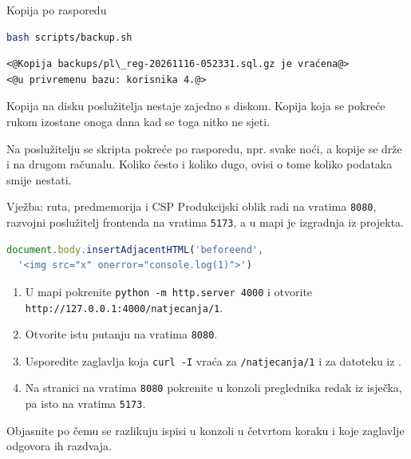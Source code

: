 \begin{frame}[fragile]{Kopija po rasporedu}
\begin{lstlisting}[language=bash]
bash scripts/backup.sh
\end{lstlisting}

\begin{lstlisting}
<@Kopija backups/pl\_reg-20261116-052331.sql.gz je vraćena@>
<@u privremenu bazu: korisnika 4.@>
\end{lstlisting}

\vspace{0.4em}
Kopija na disku poslužitelja nestaje zajedno s diskom. Kopija koja se pokreće rukom izostane onoga dana kad se toga nitko ne sjeti.

\vspace{0.4em}
\begin{konvencija}
Na poslužitelju se skripta pokreće po rasporedu, npr. svake noći, a kopije se drže i na drugom računalu. Koliko često i koliko dugo, ovisi o tome koliko podataka smije nestati.
\end{konvencija}
\end{frame}

\begin{frame}[fragile]{Vježba: ruta, predmemorija i CSP}
Produkcijski oblik radi na vratima \texttt{8080}, razvojni poslužitelj frontenda na vratima \texttt{5173}, a u mapi  je izgradnja iz projekta.

\begin{lstlisting}[language=javascript]
document.body.insertAdjacentHTML('beforeend',
  '<img src="x" onerror="console.log(1)">')
\end{lstlisting}

\begin{enumerate}
  \itemsep0.2em
  \item U mapi  pokrenite \texttt{python -m http.server 4000} i otvorite \texttt{http://127.0.0.1:4000/natjecanja/1}.
  \item Otvorite istu putanju na vratima \texttt{8080}.
  \item Usporedite zaglavlja koja \texttt{curl -I} vraća za \texttt{/natjecanja/1} i za datoteku iz .
  \item Na stranici na vratima \texttt{8080} pokrenite u konzoli preglednika redak iz isječka, pa isto na vratima \texttt{5173}.
\end{enumerate}

\vspace{0.2em}
Objasnite po čemu se razlikuju ispisi u konzoli u četvrtom koraku i koje zaglavlje odgovora ih razdvaja.
\end{frame}

